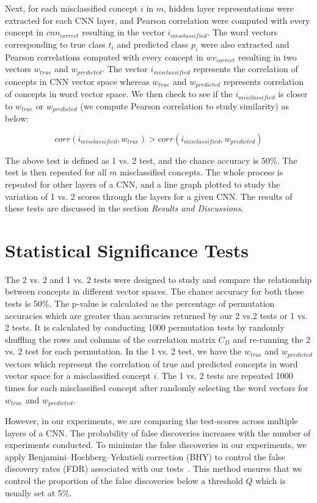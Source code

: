 Next, for each misclassified concept $i$ in $m$, hidden layer representations were extracted for each CNN layer, and Pearson correlation were computed with every concept in $cnn_{correct}$ resulting in the vector $i_{misclassified}$. The word vectors corresponding to true class $t_i$ and predicted class $p_i$ were also extracted and Pearson correlations computed with every concept in $wv_{correct}$ resulting in two vectors  $w_{true}$ and $w_{predicted}$. The vector $i_{misclassified}$ represents the correlation of concepts in CNN vector space whereas $w_{true}$ and $w_{predicted}$ represents correlation of concepts in word vector space. We then check to see if the $i_{misclassified}$ is closer to $w_{true}$ or $w_{predicted}$ (we compute Pearson correlation to study similarity) as below: 

\[corr(i_{misclassified}, w_{true}) > corr(i_{misclassified}, w_{predicted})\]

The above test is defined as 1 vs. 2 test, and the chance accuracy is 50\%. The test is then repeated for all $m$ misclassified concepts. The whole process is repeated for other layers of a CNN, and a line graph plotted to study the variation of 1 vs. 2 scores through the layers for a given CNN. The results of these tests are discussed in the section \textit{Results and Discussions}. 


\section{Statistical Significance Tests}

The 2 vs. 2 and 1 vs. 2 tests were designed to study and compare the relationship between concepts in different vector spaces. The chance accuracy for both these tests is 50\%. The p-value is calculated as the percentage of permutation accuracies which are greater than accuracies returned by our 2 vs.2 tests or 1 vs. 2 tests. It is calculated by conducting 1000 permutation tests by randomly shuffling the rows and columns of the correlation matrix $C_D$ and re-running the 2 vs. 2 test for each permutation. In the 1 vs. 2 test, we have the $w_{true}$ and $w_{predicted}$ vectors which represent the correlation of true and predicted concepts in word vector space for a misclassified concept $i$. The 1 vs. 2 tests are repeated 1000 times for each misclassified concept after randomly selecting the word vectors for $w_{true}$ and $w_{predicted}$.


However, in our experiments, we are comparing the test-scores across multiple layers of a CNN. The probability of false discoveries increases with the number of experiments conducted. To minimize the false discoveries in our experiments, we apply Benjamini–Hochberg–Yekutieli correction (BHY) to control the false discovery rates (FDR) associated with our tests~\cite{BH}. This method ensures that we control the proportion of the false discoveries below a threshold $Q$ which is usually set at 5\%.

